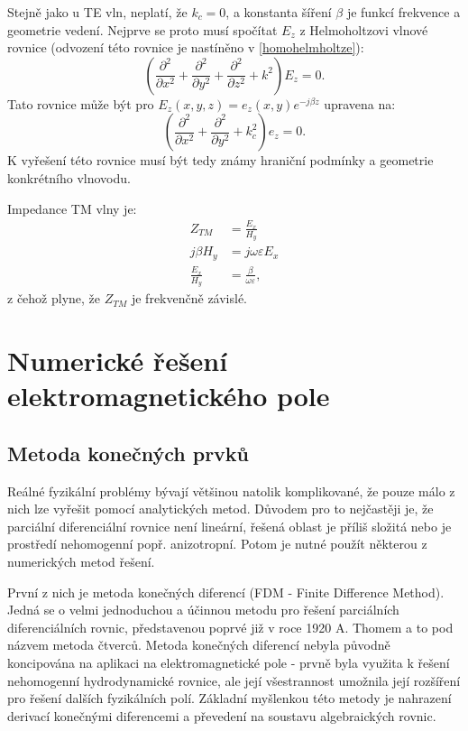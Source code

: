\documentclass[12pt,a4paper,oneside]{article}
\numberwithin{equation}{section} %
\numberwithin{figure}{section} %
\numberwithin{table}{section} %
\begin{document}
Stejně jako u TE vln, neplatí, že $k_c = 0$, a konstanta šíření $\beta$ je funkcí frekvence a geometrie vedení. Nejprve se proto musí spočítat $E_z$ z Helmoholtzovi vlnové rovnice (odvození této rovnice je nastíněno v \ref{homohelmholtze}):
\begin{equation}
\left( \frac{\partial ^2}{\partial x^2} + \frac{\partial ^2}{\partial y^2} + \frac{\partial ^2}{\partial z^2} + k^2 \right) E_z = 0 .
\end{equation}
Tato rovnice může být pro $E_z(x,y,z) = e_z(x,y)e^{-j \beta z}$ upravena na:
\begin{equation}
\left( \frac{\partial ^2}{\partial x^2} + \frac{\partial ^2}{\partial y^2} + k^2_c \right) e_z = 0 .
\end{equation}
K vyřešení této rovnice musí být tedy známy hraniční podmínky a geometrie konkrétního vlnovodu.

Impedance TM vlny je:
\begin{subequations}
\begin{align}
Z_{TM} &= \frac{E_x}{H_y}
\\
j \beta H_y &= j \omega \varepsilon E_x
\\
\frac{E_x}{H_y} &= \frac{\beta}{\omega \varepsilon} ,
\end{align}
\end{subequations}
z čehož plyne, že $Z_{TM}$ je frekvenčně závislé.


\newpage
\section{Numerické řešení elektromagnetického pole}



\subsection{Metoda konečných prvků}
\label{FEM}
Reálné fyzikální problémy bývají většinou natolik komplikované, že pouze málo z nich lze vyřešit pomocí analytických metod. Důvodem pro to nejčastěji je, že parciální diferenciální rovnice není lineární, řešená oblast je příliš složitá nebo je prostředí nehomogenní popř. anizotropní. Potom je nutné použít některou z numerických metod řešení.

První z nich je metoda konečných diferencí (FDM - Finite Difference Method). Jedná se o velmi jednoduchou a účinnou metodu pro řešení parciálních diferenciálních rovnic, představenou poprvé již v roce 1920 A. Thomem a to pod názvem metoda čtverců. Metoda konečných diferencí nebyla původně koncipována na aplikaci na elektromagnetické pole - prvně byla využita k řešení nehomogenní hydrodynamické rovnice, ale její všestrannost umožnila její rozšíření pro řešení dalších fyzikálních polí. Základní myšlenkou této metody je nahrazení derivací konečnými diferencemi a převedení na soustavu algebraických rovnic. \cite{ATE}
\end{document}
